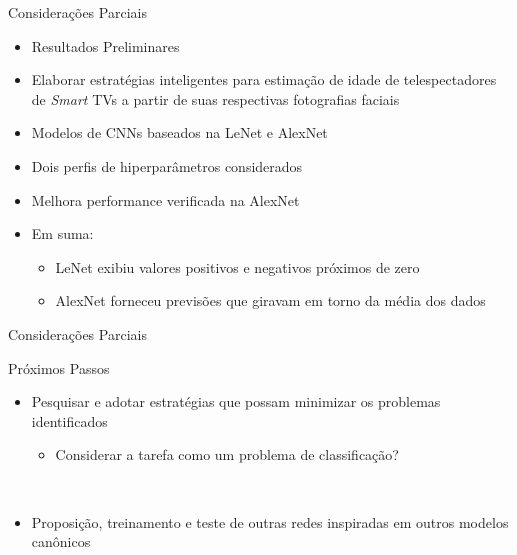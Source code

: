 \begin{frame}{Considerações Parciais}
	\begin{itemize}
		\item \alert{Resultados Preliminares}
		\item Elaborar estratégias inteligentes para estimação de idade de telespectadores de  \emph{Smart} TVs a partir de suas respectivas fotografias faciais\\
		\item Modelos de CNNs baseados na LeNet e AlexNet
		\item Dois perfis de hiperparâmetros considerados
		\item Melhora performance verificada na AlexNet
		\item Em suma:
		\begin{itemize}
			\item LeNet exibiu valores positivos e negativos próximos de zero
			\item AlexNet forneceu previsões que giravam em torno da média dos dados
		\end{itemize}
  \end{itemize}
\end{frame}

\begin{frame}{Considerações Parciais}
	\begin{block}{Próximos Passos}
		\begin{itemize}
			\item Pesquisar e adotar estratégias que possam minimizar os problemas identificados
			\begin{itemize}
				\item Considerar a tarefa como um problema de classificação?
			\end{itemize}
			\ \ \newline
			\item Proposição, treinamento e teste de outras redes inspiradas em outros modelos canônicos
		\end{itemize}
	\end{block}
\end{frame}
